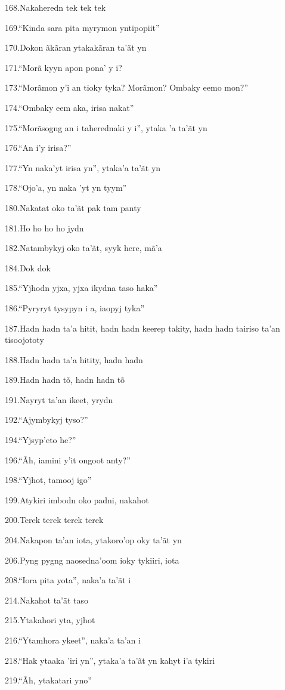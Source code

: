 168.Nakaheredn tek tek tek

169.``Kinda sara pita myrymon yntipopiit''

170.Dokon ãkãran ytakakãran ta'ãt yn

171.``Morã kyyn apon pona' y i?

173.``Morãmon y'i an tioky tyka? Morãmon? Ombaky eemo mon?''

174.``Ombaky eem aka, irisa nakat''

175.``Morãsogng an i taherednaki y i'', ytaka 'a ta'ãt yn

176.``An i'y irisa?''

177.``Yn naka'yt irisa yn'', ytaka'a ta'ãt yn

178.``Ojo'a, yn naka 'yt yn tyym''

180.Nakatat oko ta'ãt pak tam panty

181.Ho ho ho ho jydn

182.Natambykyj oko ta'ãt, syyk here, mã'a

184.Dok dok

185.``Yjhodn yjxa, yjxa ikydna taso haka''

186.``Pyryryt tysypyn i a, iaopyj tyka''

187.Hadn hadn ta'a hitit, hadn hadn keerep takity, hadn hadn tairiso
ta'an tisoojototy

188.Hadn hadn ta'a hitity, hadn hadn

189.Hadn hadn tõ, hadn hadn tõ

191.Nayryt ta'an ikeet, yrydn

192.``Ajymbykyj tyso?''

194.``Yjsyp'eto he?''

196.``Ãh, iamini y'it ongoot anty?''

198.``Yjhot, tamooj igo''

199.Atykiri imbodn oko padni, nakahot

200.Terek terek terek terek

204.Nakapon ta'an iota, ytakoro'op oky ta'ãt yn

206.Pyng pygng naosedna'oom ioky tykiiri, iota

208.``Iora pita yota'', naka'a ta'ãt i

214.Nakahot ta'ãt taso

215.Ytakahori yta, yjhot

216.``Ytamhora ykeet'', naka'a ta'an i

218.``Hak ytaaka 'iri yn'', ytaka'a ta'ãt yn kahyt i'a tykiri

219.``Ãh, ytakatari yno''

